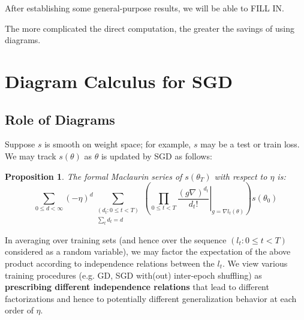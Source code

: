 \documentclass{article}
\newtheorem{prop}{Proposition}
\begin{document}
    After establishing some general-purpose results, we will be able to
    {\color{red} FILL IN}. 
    
    The more complicated the direct computation, the greater the savings of
    using diagrams.
        

\section{Diagram Calculus for SGD}
\subsection{Role of Diagrams}
    Suppose $s$ is smooth on weight space; for example, $s$ may be a test or
    train loss.  We may track $s(\theta)$ as $\theta$ is updated by SGD as
    follows:
    \begin{prop}
        The formal Maclaurin series of $s(\theta_T)$ with respect to $\eta$ is:
        \begin{equation*}\label{eq:dyson}
            \sum_{0\leq d < \infty} (-\eta)^d \sum_{\substack{(d_t: 0\leq t<T) \\ \sum_t d_t = d}}
            \left(
                \prod_{0 \leq t < T}
                    \left.  \frac{(g \nabla)^{d_t}}{d_t!} \right|_{g=\nabla l_t(\theta)}
            \right)
            s (\theta_0)
        \end{equation*}
    \end{prop}
    In averaging over training sets (and hence over the sequence $(l_t: 0\leq
    t<T)$ considered as a random variable), we may factor the expectation of
    the above product according to independence relations between the $l_t$.
    We view various training procedures (e.g. GD, SGD with(out) inter-epoch
    shuffling) as {\bf prescribing different independence relations} that lead
    to different factorizations and hence to potentially different
    generalization behavior at each order of $\eta$.
\end{document}
